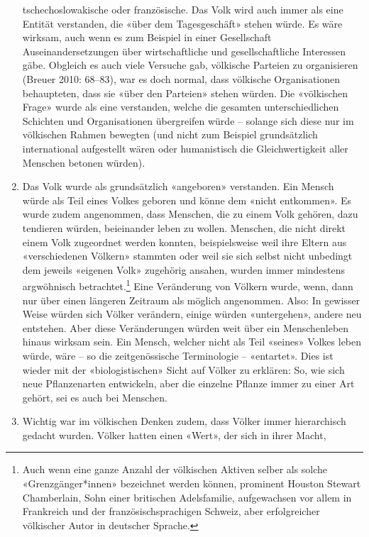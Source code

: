 \documentclass[a4paper,
fontsize=11pt,
oneside,
numbers=noperiodatend,
parskip=half-,
bibliography=totoc,
final
]{scrartcl}
\begin{document}
\begin{enumerate}
  tschechoslowakische oder französische. Das Volk wird auch immer als
  eine Entität verstanden, die «über dem Tagesgeschäft» stehen würde. Es
  wäre wirksam, auch wenn es zum Beispiel in einer Gesellschaft
  Auseinandersetzungen über wirtschaftliche und gesellschaftliche
  Interessen gäbe. Obgleich es auch viele Versuche gab, völkische
  Parteien zu organisieren (Breuer 2010: 68--83), war es doch normal,
  dass völkische Organisationen behaupteten, dass sie «über den
  Parteien» stehen würden. Die «völkischen Frage» wurde als eine
  verstanden, welche die gesamten unterschiedlichen Schichten und
  Organisationen übergreifen würde -- solange sich diese nur im
  völkischen Rahmen bewegten (und nicht zum Beispiel grundsätzlich
  international aufgestellt wären oder humanistisch die Gleichwertigkeit
  aller Menschen betonen würden).
\item
  Das Volk wurde als grundsätzlich «angeboren» verstanden. Ein Mensch
  würde als Teil eines Volkes geboren und könne dem «nicht entkommen».
  Es wurde zudem angenommen, dass Menschen, die zu einem Volk gehören,
  dazu tendieren würden, beieinander leben zu wollen. Menschen, die
  nicht direkt einem Volk zugeordnet werden konnten, beispielsweise weil
  ihre Eltern aus «verschiedenen Völkern» stammten oder weil sie sich
  selbst nicht unbedingt dem jeweils «eigenen Volk» zugehörig ansahen,
  wurden immer mindestens argwöhnisch betrachtet.\footnote{Auch wenn
    eine ganze Anzahl der völkischen Aktiven selber als solche
    «Grenzgänger*innen» bezeichnet werden können, prominent Houston
    Stewart Chamberlain, Sohn einer britischen Adelsfamilie,
    aufgewachsen vor allem in Frankreich und der französischsprachigen
    Schweiz, aber erfolgreicher völkischer Autor in deutscher Sprache.}
  Eine Veränderung von Völkern wurde, wenn, dann nur über einen längeren
  Zeitraum als möglich angenommen. Also: In gewisser Weise würden sich
  Völker verändern, einige würden «untergehen», andere neu entstehen.
  Aber diese Veränderungen würden weit über ein Menschenleben hinaus
  wirksam sein. Ein Mensch, welcher nicht als Teil «seines» Volkes leben
  würde, wäre -- so die zeitgenössische Terminologie -- «entartet». Dies
  ist wieder mit der «biologistischen» Sicht auf Völker zu erklären: So,
  wie sich neue Pflanzenarten entwickeln, aber die einzelne Pflanze
  immer zu einer Art gehört, sei es auch bei Menschen.
\item
  Wichtig war im völkischen Denken zudem, dass Völker immer hierarchisch
  gedacht wurden. Völker hatten einen «Wert», der sich in ihrer Macht,

\end{enumerate}
\end{document}
